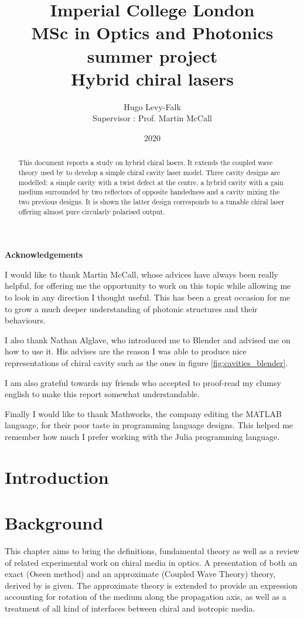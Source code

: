 \documentclass{report}
\title{Imperial College London\\MSc in Optics and Photonics summer project\\Hybrid chiral lasers}
\author{Hugo Levy-Falk\\Supervisor : Prof. Martin McCall}
\date{2020}
\newenvironment{acknowledgements}%
{\cleardoublepage\thispagestyle{empty}\null\vfill\begin{center}%
		\bfseries Acknowledgements\end{center}}%
{\vfill\null}
\begin{document}
	
\maketitle

\begin{abstract}
	
	This document reports a study on hybrid chiral lasers. It extends the coupled wave theory used by  to develop a simple chiral cavity laser model. Three cavity designs are modelled: a simple cavity with a twist defect at the centre, a hybrid cavity with a gain medium surrounded by two reflectors of opposite handedness and a cavity mixing the two previous designs. It is shown the latter design corresponds to a tunable chiral laser offering almost pure circularly polarised output.

\end{abstract}

\begin{acknowledgements}
	I would like to thank Martin McCall, whose advices have always been really helpful, for offering me the opportunity to work on this topic while allowing me to look in any direction I thought useful. This has been a great occasion for me to grow a much deeper understanding of photonic structures and their behaviours.
	
	I also thank Nathan Alglave, who introduced me to Blender and advised me on how to use it. His advises are the reason I was able to produce nice representations of chiral cavity such as the ones in figure \ref{fig:cavities_blender}.
	
	I am also grateful towards my friends who accepted to proof-read my clumsy english to make this report somewhat understandable.
	
	Finally I would like to thank Mathworks, the company editing the MATLAB language, for their poor taste in programming language designs. This helped me remember how much I prefer working with the Julia programming language.
\end{acknowledgements}

\tableofcontents
\listoffigures

\chapter{Introduction}

\chapter{Background}
This chapter aims to bring the definitions, fundamental theory as well as a review of related experimental work on chiral media in optics. A presentation of both an exact (Oseen method) and an approximate (Coupled Wave Theory) theory, derived by \textcite{mccall_simplified_2009} is given. The approximate theory is extended to provide an expression accounting for rotation of the medium along the propagation axis, as well as a treatment of all kind of interfaces between chiral and isotropic media. 






\end{document}

